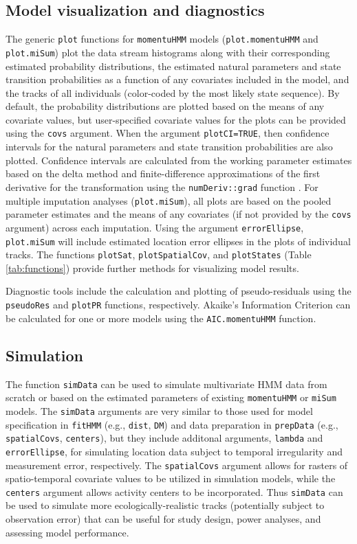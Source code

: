 \documentclass[12pt]{article}\usepackage[]{graphicx}\usepackage[]{color}
\begin{document}
\subsection{Model visualization and diagnostics}
The generic \verb|plot| functions for \verb|momentuHMM| models (\verb|plot.momentuHMM| and \verb|plot.miSum|) plot the data stream histograms along with their corresponding estimated probability distributions, the estimated natural parameters and state transition probabilities as a function of any covariates included in the model, and the tracks of all individuals (color-coded by the most likely state sequence). By default, the probability distributions are plotted based on the means of any covariate values, but user-specified covariate values for the plots can be provided using the \verb|covs| argument.  When the argument \verb|plotCI=TRUE|, then confidence intervals for the natural parameters and state transition probabilities are also plotted. Confidence intervals are calculated from the working parameter estimates based on the delta method and finite-difference approximations of the first derivative for the transformation using the \verb|numDeriv::grad| function \citep{GilbertVaradhan2016}.  For multiple imputation analyses (\verb|plot.miSum|), all plots are based on the pooled parameter estimates and the means of any covariates (if not provided by the \verb|covs| argument) across each imputation. Using the argument \verb|errorEllipse|, \verb|plot.miSum| will include estimated location error ellipses in the plots of individual tracks. The functions \verb|plotSat|, \verb|plotSpatialCov|, and \verb|plotStates| (Table \ref{tab:functions}) provide further methods for visualizing model results.

Diagnostic tools include the calculation and plotting of pseudo-residuals \citep{ZucchiniEtAl2016} using the \verb|pseudoRes| and \verb|plotPR| functions, respectively. Akaike's Information Criterion can be calculated for one or more models using the \verb|AIC.momentuHMM| function.

\subsection{Simulation}
The function \verb|simData| can be used to simulate multivariate HMM data from scratch or based on the estimated parameters of existing \verb|momentuHMM| or \verb|miSum| models.  The \verb|simData| arguments are very similar to those used for model specification in \verb|fitHMM| (e.g., \verb|dist|, \verb|DM|) and data preparation in \verb|prepData| (e.g., \verb|spatialCovs|, \verb|centers|), but they include additonal arguments, \verb|lambda| and \verb|errorEllipse|, for simulating location data subject to temporal irregularity and measurement error, respectively. The \verb|spatialCovs| argument allows for rasters of spatio-temporal covariate values to be utilized in simulation models, while the \verb|centers| argument allows activity centers to be incorporated. Thus \verb|simData| can be used to simulate more ecologically-realistic tracks (potentially subject to observation error) that can be useful for study design, power analyses, and assessing model performance.
  
\end{document}
